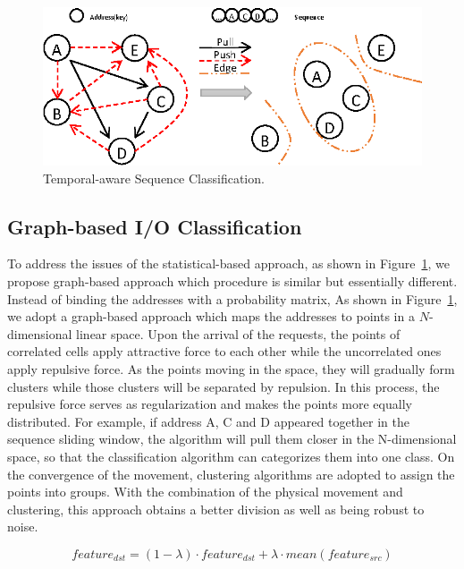 \begin{figure}[h]
\centering
\includegraphics[width=0.9\linewidth]{fig/sequence_grouping.eps}
\caption{Temporal-aware Sequence Classification.}
\label{fig:sequence_grouping}
\end{figure}

\subsection{Graph-based I/O Classification}

To address the issues of the statistical-based approach, as shown in Figure~\ref{fig:sequence_grouping},
we propose graph-based approach which procedure is similar but essentially different.
Instead of binding the addresses with a probability matrix,
As shown in Figure~\ref{fig:sequence_grouping}, we adopt a graph-based approach which
maps the addresses to points in a $N$-dimensional linear space.
Upon the arrival of the requests, the points of correlated cells apply attractive force to each other while the uncorrelated ones apply repulsive force.
As the points moving in the space, they will gradually form clusters while those clusters will be separated by repulsion.
In this process, the repulsive force serves as regularization and makes the points more equally distributed.
For example, if address A, C and D appeared together in the sequence sliding window,
the algorithm will pull them closer in the N-dimensional space,
so that the classification algorithm can categorizes them into one class.
On the convergence of the movement, clustering algorithms are adopted to assign the points into groups.
With the combination of the physical movement and clustering, this approach obtains a better division as well as being robust to noise.

\begin{equation}
\label{eq:physicalbasedequation}
feature_{dst} = (1 - \lambda) \cdot feature_{dst} + \lambda \cdot mean(feature_{src})
\end{equation}

